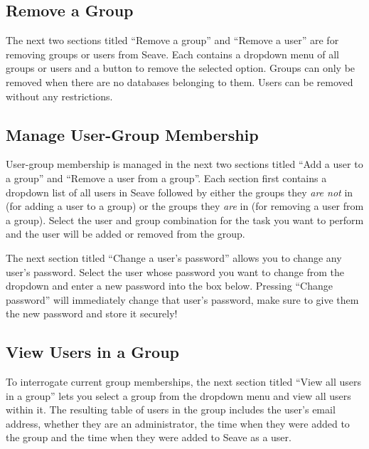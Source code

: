 \documentclass[11pt, a4paper]{article}
\begin{document}

\subsection{Remove a Group}

The next two sections titled ``Remove a group'' and ``Remove a user'' are for removing groups or users from Seave. Each contains a dropdown menu of all groups or users and a button to remove the selected option. Groups can only be removed when there are no databases belonging to them. Users can be removed without any restrictions.


\subsection{Manage User-Group Membership}

User-group membership is managed in the next two sections titled ``Add a user to a group'' and ``Remove a user from a group''. Each section first contains a dropdown list of all users in Seave followed by either the groups they \textit{are not} in (for adding a user to a group) or the groups they \textit{are} in (for removing a user from a group). Select the user and group combination for the task you want to perform and the user will be added or removed from the group.

The next section titled ``Change a user's password'' allows you to change any user's password. Select the user whose password you want to change from the dropdown and enter a new password into the box below. Pressing ``Change password'' will immediately change that user's password, make sure to give them the new password and store it securely!


\subsection{View Users in a Group}

To interrogate current group memberships, the next section titled ``View all users in a group'' lets you select a group from the dropdown menu and view all users within it. The resulting table of users in the group includes the user's email address, whether they are an administrator, the time when they were added to the group and the time when they were added to Seave as a user.
\end{document}
